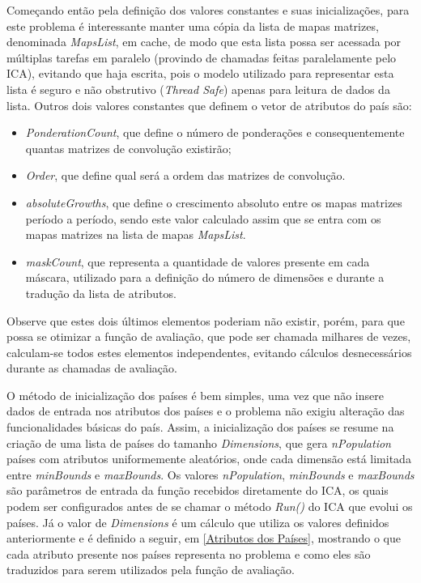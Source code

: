 Começando então pela definição dos valores constantes e suas inicializações, para este problema é interessante manter uma cópia da lista de mapas matrizes, denominada \emph{MapsList}, em cache, de modo que esta lista possa ser acessada por múltiplas tarefas em paralelo (provindo de chamadas feitas paralelamente pelo ICA), evitando que haja escrita, pois o modelo utilizado para representar esta lista é seguro e não obstrutivo (\emph{Thread Safe}) apenas para leitura de dados da lista. Outros dois valores constantes que definem o vetor de atributos do país são:
\begin{itemize}
\item \emph{PonderationCount}, que define o número de ponderações e consequentemente quantas matrizes de convolução existirão;
\item \emph{Order}, que define qual será a ordem das matrizes de convolução. 
\item \emph{absoluteGrowths}, que define o crescimento absoluto entre os mapas matrizes período a período, sendo este valor calculado assim que se entra com os mapas matrizes na lista de mapas \emph{MapsList}.
\item \emph{maskCount}, que representa a quantidade de valores presente em cada máscara, utilizado para a definição do número de dimensões e durante a tradução da lista de atributos. 
\end{itemize}

Observe que estes dois últimos elementos poderiam não existir, porém, para que possa se otimizar a função de avaliação, que pode ser chamada milhares de vezes, calculam-se todos estes elementos independentes, evitando cálculos desnecessários durante as chamadas de avaliação.

O método de inicialização dos países é bem simples, uma vez que não insere dados de entrada nos atributos dos países e o problema não exigiu alteração das funcionalidades básicas do país. Assim, a inicialização dos países se resume na criação de uma lista de países do tamanho \emph{Dimensions}, que gera \emph{nPopulation} países com atributos uniformemente aleatórios, onde cada dimensão está limitada entre \emph{minBounds} e \emph{maxBounds}. Os valores \emph{nPopulation}, \emph{minBounds} e \emph{maxBounds} são parâmetros de entrada da função recebidos diretamente do ICA, os quais podem ser configurados antes de se chamar o método \emph{Run()} do ICA que evolui os países. Já o valor de \emph{Dimensions} é um cálculo que utiliza os valores definidos anteriormente e é definido a seguir,  em \ref{Atributos dos Países}, mostrando o que cada atributo presente nos países representa no problema e como eles são traduzidos para serem utilizados pela função de avaliação.





